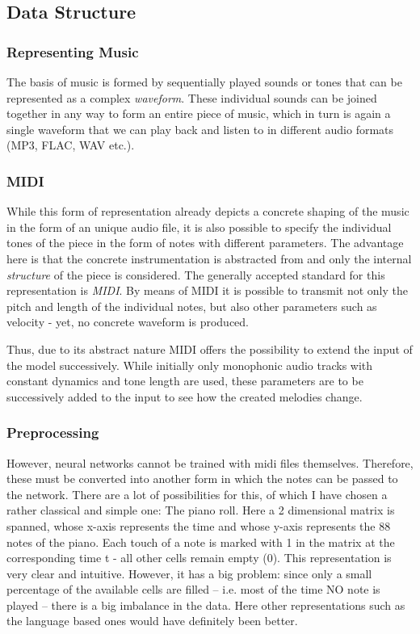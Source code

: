 \documentclass[a4paper, 10pt, xcolor=dvipsnames]{article} %
\begin{document}
\subsection{Data Structure}

\subsubsection{Representing Music}

The basis of music is formed by sequentially played sounds or tones that can
be represented as a complex \emph{waveform}. These individual sounds can be joined
together in any way to form an entire piece of music, which in turn is again a
single waveform that we can play back and listen to in different audio
formats (MP3, FLAC, WAV etc.).

\subsubsection{MIDI}

While this form of representation already depicts a concrete shaping of the
music in the form of an unique audio file, it is also possible to specify the
individual tones of the piece in the form of notes with different parameters.
The advantage here is that the concrete instrumentation is abstracted from and
only the internal \emph{structure} of the piece is considered. The generally
accepted standard for this representation is \emph{MIDI}. By means of MIDI it
is possible to transmit not only the pitch and length of the individual notes,
but also other parameters such as velocity - yet, no concrete waveform is
produced.

Thus, due to its abstract nature MIDI offers the possibility to extend the
input of the model successively. While initially only monophonic audio tracks
with constant dynamics and tone length are used, these parameters are to be
successively added to the input to see how the created melodies change.

\subsubsection{Preprocessing}
However, neural networks cannot be trained with midi files themselves.
Therefore, these must be converted into another form in which the notes can be
passed to the network. There are a lot of possibilities for this, of which I
have chosen a rather classical and simple one: The piano roll. Here a 2
dimensional matrix is spanned, whose x-axis represents the time and whose
y-axis represents the 88 notes of the piano. Each touch of a note is marked
with 1 in the matrix at the corresponding time t - all other cells remain empty
(0). This representation is very clear and intuitive. However, it has a big
problem: since only a small percentage of the available cells are filled --
i.e. most of the time NO note is played -- there is a big imbalance in the
data. Here other representations such as the language based ones would have
definitely been better.
\end{document}
